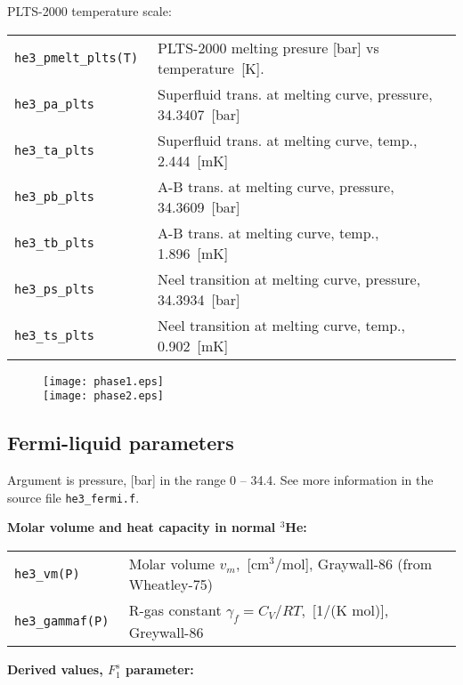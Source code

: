 \documentclass[a4paper]{article}
\begin{document}
PLTS-2000 temperature scale:

\medskip
\noindent\begin{tabular}{lp{11cm}}
\tt he3\_pmelt\_plts(T) & PLTS-2000 melting presure [bar] vs temperature~[K].\\
\tt he3\_pa\_plts       & Superfluid trans. at melting curve, pressure, 34.3407~[bar]\\
\tt he3\_ta\_plts       & Superfluid trans. at melting curve, temp., 2.444~[mK]\\
\tt he3\_pb\_plts       & A-B trans. at melting curve, pressure, 34.3609~[bar]\\
\tt he3\_tb\_plts       & A-B trans. at melting curve, temp., 1.896~[mK]\\
\tt he3\_ps\_plts       & Neel transition at melting curve, pressure, 34.3934~[bar]\\
\tt he3\_ts\_plts       & Neel transition at melting curve, temp., 0.902~[mK]\\
\end{tabular}
\medskip

\begin{figure}[p]
\texttt{[image: phase1.eps]}\\
\texttt{[image: phase2.eps]}
\end{figure}

\eject
\subsection*{Fermi-liquid parameters}

Argument is pressure, [bar] in the range 0 -- 34.4. See more information
in the source file {\tt he3\_fermi.f}.

\medskip
{\bf Molar volume and heat capacity in normal $^3$He:}

\medskip
\noindent\begin{tabular}{lp{11cm}}
\tt he3\_vm(P)     & Molar volume $v_m$,~[cm$^3$/mol], Graywall-86 (from Wheatley-75)\\
\tt he3\_gammaf(P) & R-gas constant $\gamma_f = C_V/RT$,~[1/(K mol)], Greywall-86\\
\end{tabular}
\medskip

{\bf Derived values, $F_1^s$ parameter:}
\end{document}
